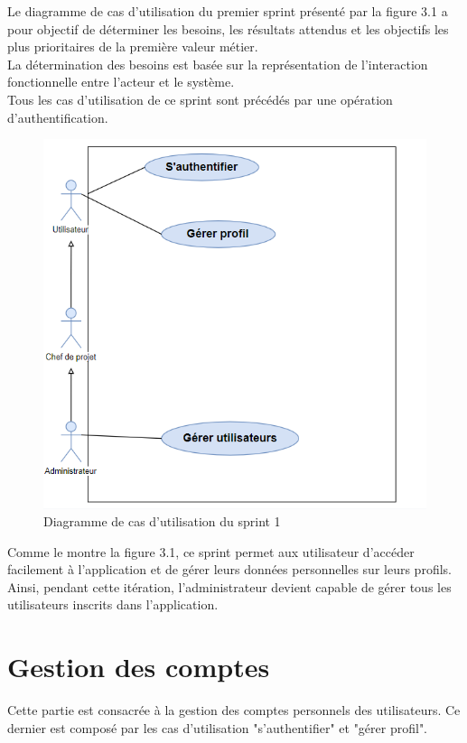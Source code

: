 Le diagramme de cas d'utilisation du premier sprint présenté par la figure 3.1 a pour objectif de déterminer les besoins, les résultats attendus 
et les objectifs les plus prioritaires de la première valeur métier.\\ La détermination des besoins est basée sur la représentation de
l'interaction fonctionnelle entre l'acteur et le système.\\
Tous les cas d'utilisation de ce sprint sont précédés par une opération d'authentification.
\begin{figure}[H]
	\centering
	\includegraphics[scale=0.6]{Rsprint1.PNG}
	\caption{Diagramme de cas d'utilisation du sprint 1}
	\label{Diagramme de cas d'utilisation du sprint 1}
\end{figure} 
Comme le montre la figure 3.1, ce sprint permet aux utilisateur d'accéder facilement à l'application et de gérer leurs données personnelles sur leurs profils. Ainsi, pendant cette itération, l'administrateur devient capable de gérer tous les utilisateurs inscrits dans l'application.
\section{Gestion des comptes }

Cette partie est consacrée à la gestion des comptes personnels des utilisateurs. Ce dernier est composé  par les cas d'utilisation "s'authentifier" et "gérer profil". 
